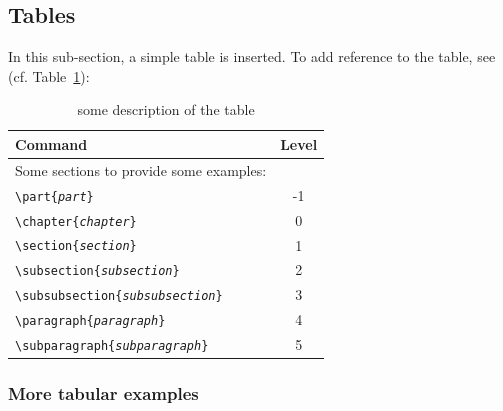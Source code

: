 \subsection{Tables}
In this sub-section, a simple table is inserted. To add reference to the table, see (cf. Table~\hyperref[tab:tableexample0]{\ref{tab:tableexample0}}):

\begin{table}[htb]
	\begin{tabular}{|b{7cm}|c|}
		
		\hline  %
		\fontsize{11pt}{12pt}\selectfont Command & Level \\ \hline  %
		\fontsize{10pt}{14pt}\selectfont Some sections to provide some examples: & \\
		\texttt{\textbackslash part\{\emph{part}\}} & -1 \\
		\texttt{\textbackslash chapter\{\emph{chapter}\}} & 0 \\
		\texttt{\textbackslash section\{\emph{section}\}} & 1 \\
		\texttt{\textbackslash subsection\{\emph{subsection}\}} & 2 \\
		\texttt{\textbackslash subsubsection\{\emph{subsubsection}\}} & 3 \\
		\texttt{\textbackslash paragraph\{\emph{paragraph}\}} & 4 \\
		\texttt{\textbackslash subparagraph\{\emph{subparagraph}\}} & 5 \\
		\hline
		
	\end{tabular}
	\caption{some description of the table}
	\label{tab:tableexample0}
\end{table}

\subsubsection{More tabular examples}

